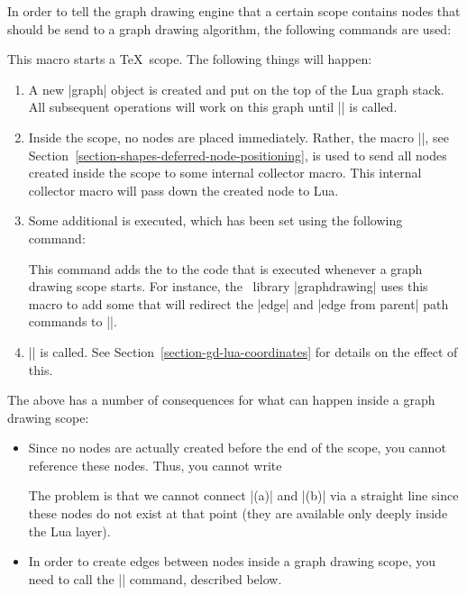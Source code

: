 In order to tell the graph drawing engine that a certain scope
contains nodes that should be send to a graph drawing algorithm, the
following commands are used:

\begin{command}{\pgfgdbeginscope}
  This macro starts a \TeX\ scope. The following things will happen:
  \begin{enumerate}
  \item A new |graph| object is created and put on the top of the Lua
    graph stack. All subsequent operations will work on this graph until
    |\pgfgdendscope| is called.
  \item Inside the scope, no nodes are placed immediately. Rather, 
    the macro |\pgfpositionnodelater|, see
    Section~\ref{section-shapes-deferred-node-positioning}, is used to
    send all nodes created inside the scope to some internal collector
    macro. This internal collector macro will pass down the created
    node to Lua.
  \item Some additional  is executed, which has been set
    using the following command:
    \begin{command}{\pgfgdaddspecificationhook{}}
      This command adds the  to the code that is executed
      whenever a graph drawing scope starts. For instance, the
      \tikzname\ library |graphdrawing| uses this macro to add some
       that will redirect the |edge| and |edge from parent|
      path commands to |\pgfgdedge|.
    \end{command}
  \item |\pgftransformreset| is called. See
    Section~\ref{section-gd-lua-coordinates} for details on the effect
    of this.
  \end{enumerate}
  The above has a number of consequences for what can happen inside a
  graph drawing scope:
  \begin{itemize}
  \item Since no nodes are actually created before the end of the
    scope, you cannot reference these nodes. Thus, you cannot write
\begin{codeexample}
\end{codeexample}
    The problem is that we cannot connect |(a)| and |(b)| via a
    straight line since these nodes do not exist at that point (they
    are available only deeply inside the Lua layer).
  \item In order to create edges between nodes inside a graph drawing
    scope, you need to call the |\pgfgdedge| command, described below.
  \end{itemize}
\end{command}


